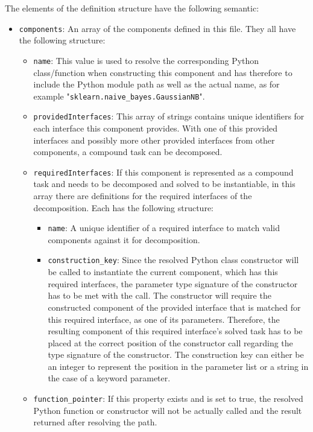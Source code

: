 The elements of the definition structure have the following semantic:
\begin{itemize}
	\item \texttt{components}: An array of the components defined in this file. They all have the following structure:
		\begin{itemize}[label=\textbullet]
			\item \texttt{name}: This value is used to resolve the corresponding Python class/function when constructing this component and has therefore to include the Python module path as well as the actual name, as for example "\texttt{sklearn.naive\_bayes.GaussianNB}".
			\item \texttt{providedInterfaces}: This array of strings contains unique identifiers for each interface this component provides. With one of this provided interfaces and possibly more other provided interfaces from other components, a compound task can be decomposed. 
            \item \texttt{requiredInterfaces}: If this component is represented as a compound task and needs to be decomposed and solved to be instantiable, in this array there are definitions for the required interfaces of the decomposition. Each has the following structure:
            \begin{itemize}[label=\textbullet]
                \item \texttt{name}: A unique identifier of a required interface to match valid components against it for decomposition.
                \item \texttt{construction\_key}: Since the resolved Python class constructor will be called to instantiate the current component, which has this required interfaces, the parameter type signature of the constructor has to be met with the call.
                    The constructor will require the constructed component of the provided interface that is matched for this required interface, as one of its parameters.
                    Therefore, the resulting component of this required interface's solved task has to be placed at the correct position of the constructor call regarding the type signature of the constructor.
                    The construction key can either be an integer to represent the position in the parameter list or a string in the case of a keyword parameter. 
            \end{itemize}
            \item \texttt{function\_pointer}: If this property exists and is set to true, the resolved Python function or constructor will not be actually called and the result returned after resolving the path.

\end{itemize}
\end{itemize}
